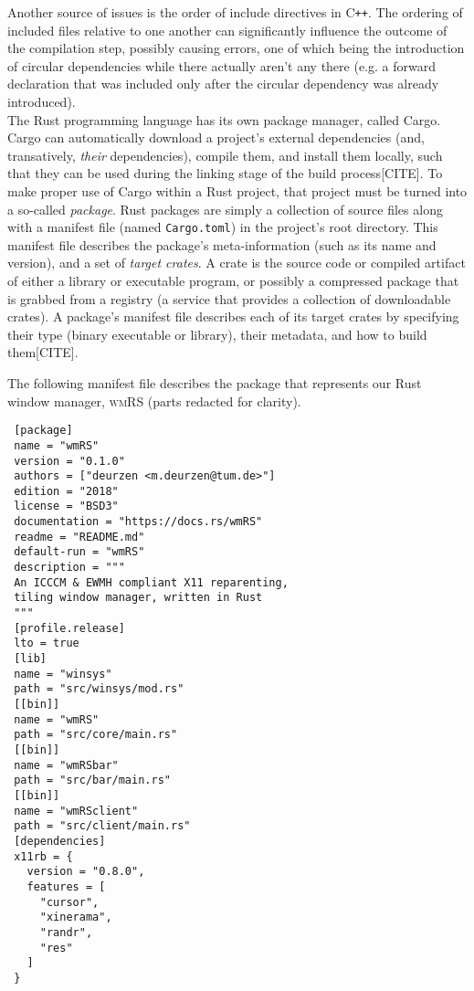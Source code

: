 Another source of issues is the order of include directives in C\texttt{++}. The
ordering of included  files relative to one another  can significantly influence
the outcome of the compilation step, possibly causing errors, one of which being
the introduction of circular dependencies  while there actually aren't any there
(e.g. a forward declaration that was included only after the circular dependency
was already introduced).\\


The Rust programming  language has its own package manager,  called Cargo. Cargo
can automatically download a project's external dependencies (and, transatively,
\textit{their} dependencies), compile them, and  install them locally, such that
they can be  used during the linking  stage of the build  process[CITE]. To make
proper use of  Cargo within a Rust  project, that project must be  turned into a
so-called  \textit{package}. Rust  packages are  simply a  collection of  source
files along  with a manifest  file (named \texttt{Cargo.toml}) in  the project's
root  directory. This  manifest  file describes  the package's  meta-information
(such as its name and version), and  a set of \textit{target crates}. A crate is
the source code or compiled artifact  of either a library or executable program,
or possibly a compressed package that is grabbed from a registry (a service that
provides  a  collection  of  downloadable crates).  A  package's  manifest  file
describes each of its target crates  by specifying their type (binary executable
or library), their metadata, and how to build them[CITE].

The  following manifest  file describes  the  package that  represents our  Rust
window manager, \textsc{wmRS} (parts redacted for clarity).\\

\begin{verbatim}
 [package]
 name = "wmRS"
 version = "0.1.0"
 authors = ["deurzen <m.deurzen@tum.de>"]
 edition = "2018"
 license = "BSD3"
 documentation = "https://docs.rs/wmRS"
 readme = "README.md"
 default-run = "wmRS"
 description = """
 An ICCCM & EWMH compliant X11 reparenting,
 tiling window manager, written in Rust
 """
 [profile.release]
 lto = true
 [lib]
 name = "winsys"
 path = "src/winsys/mod.rs"
 [[bin]]
 name = "wmRS"
 path = "src/core/main.rs"
 [[bin]]
 name = "wmRSbar"
 path = "src/bar/main.rs"
 [[bin]]
 name = "wmRSclient"
 path = "src/client/main.rs"
 [dependencies]
 x11rb = {
   version = "0.8.0",
   features = [
     "cursor",
     "xinerama",
     "randr",
     "res"
   ]
 }
\end{verbatim}

